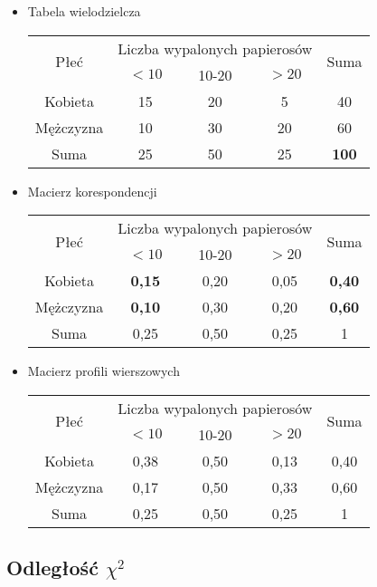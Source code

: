 \documentclass{beamer}
\begin{document}
\begin{frame}{}
  \begin{scriptsize}
    \begin{itemize}
\item Tabela wielodzielcza\\
\begin{tabular}{|c|c|c|c|c|}\hline
\multirow{2}{*}{Płeć} & \multicolumn{3}{|c|}{Liczba wypalonych papierosów}& \multirow{2}{*}{Suma}\\ \cline{2-4}
& $<10$ & 10-20 & $>20$ & \\ \hline
Kobieta & 15 & 20 & 5 & 40\\\hline
Mężczyzna & 10 & 30 & 20 & 60\\\hline
Suma & 25 & 50 & 25 & \textbf{100}\\\hline
\end{tabular}
\item Macierz korespondencji
\begin{tabular}{|c|c|c|c|c|}\hline
\multirow{2}{*}{Płeć} & \multicolumn{3}{|c|}{Liczba wypalonych papierosów}& \multirow{2}{*}{Suma}\\ \cline{2-4}
& $<10$ & 10-20 & $>20$ & \\ \hline
Kobieta & \textbf{0,15} & 0,20 & 0,05 & \textbf{0,40}\\\hline
Mężczyzna & \textbf{0,10} & 0,30 & 0,20 & \textbf{0,60}\\\hline
Suma & 0,25 & 0,50 & 0,25 & 1\\\hline
\end{tabular}
\item Macierz profili wierszowych
\begin{tabular}{|c|c|c|c|c|}\hline
\multirow{2}{*}{Płeć} & \multicolumn{3}{|c|}{Liczba wypalonych papierosów}& \multirow{2}{*}{Suma}\\ \cline{2-4}
& $<10$ & 10-20 & $>20$ & \\ \hline
Kobieta & 0,38 & 0,50 & 0,13 & 0,40\\\hline
Mężczyzna & 0,17 & 0,50 & 0,33 & 0,60\\\hline
Suma & 0,25 & 0,50 & 0,25 & 1\\\hline
\end{tabular}
\end{itemize}
\end{scriptsize}
\end{frame}

\subsection{Odległość $\chi^2$}
\end{document}
